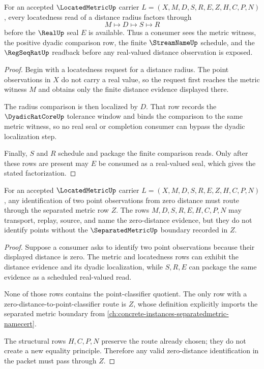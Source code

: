 \begin{theorem}
\label{thm:located-metric-dyadic-radius-localization}
For an accepted $\LocatedMetricUp$ carrier $L=(X,M,D,S,R,E,Z,H,C,P,N)$, every locatedness read of a distance radius factors through
$$
M\longmapsto D\longmapsto S\longmapsto R
$$
before the $\RealUp$ seal $E$ is available. Thus a consumer sees the metric witness, the positive dyadic comparison row, the finite $\StreamNameUp$ schedule, and the $\RegSeqRatUp$ readback before any real-valued distance observation is exposed.
\end{theorem}
\begin{proof}
Begin with a locatedness request for a distance radius. The point observations in $X$ do not carry a real value, so the request first reaches the metric witness $M$ and obtains only the finite distance evidence displayed there.

The radius comparison is then localized by $D$. That row records the $\DyadicRatCoreUp$ tolerance window and binds the comparison to the same metric witness, so no real seal or completion consumer can bypass the dyadic localization step.

Finally, $S$ and $R$ schedule and package the finite comparison reads. Only after these rows are present may $E$ be consumed as a real-valued seal, which gives the stated factorization.
\end{proof}

\begin{theorem}
\label{thm:located-metric-separated-zero-route}
For an accepted $\LocatedMetricUp$ carrier $L=(X,M,D,S,R,E,Z,H,C,P,N)$, any identification of two point observations from zero distance must route through the separated metric row $Z$. The rows $M,D,S,R,E,H,C,P,N$ may transport, replay, source, and name the zero-distance evidence, but they do not identify points without the $\SeparatedMetricUp$ boundary recorded in $Z$.
\end{theorem}
\begin{proof}
Suppose a consumer asks to identify two point observations because their displayed distance is zero. The metric and locatedness rows can exhibit the distance evidence and its dyadic localization, while $S,R,E$ can package the same evidence as a scheduled real-valued read.

None of those rows contains the point-classifier quotient. The only row with a zero-distance-to-point-classifier route is $Z$, whose definition explicitly imports the separated metric boundary from \autoref{ch:concrete-instances-separatedmetric-namecert}.

The structural rows $H,C,P,N$ preserve the route already chosen; they do not create a new equality principle. Therefore any valid zero-distance identification in the packet must pass through $Z$.
\end{proof}


